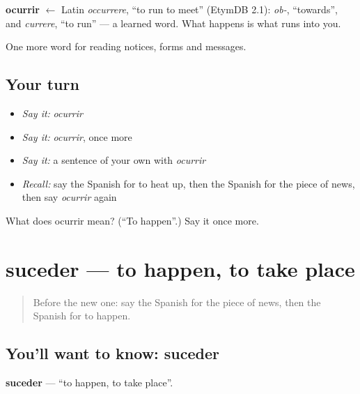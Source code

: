 \begin{cousinweb}
\textbf{ocurrir} $\leftarrow$ Latin \emph{occurrere}, \textquotedblleft{}to run to meet\textquotedblright{} (EtymDB 2.1): \emph{ob-}, \textquotedblleft{}towards\textquotedblright{}, and \emph{currere}, \textquotedblleft{}to run\textquotedblright{} — a learned word. What happens is what runs into you.
\end{cousinweb}

\begin{grammarlens}[title={What you've built}]
One more word for reading notices, forms and messages.
\end{grammarlens}

\subsection*{Your turn}
\begin{itemize}
\raggedright
  \item \emph{Say it:} \emph{ocurrir}
  \item \emph{Say it:} \emph{ocurrir}, once more
  \item \emph{Say it:} a sentence of your own with \emph{ocurrir}
  \item \emph{Recall:} say the Spanish for to heat up, then the Spanish for the piece of news, then say \emph{ocurrir} again
\end{itemize}

\begin{tcolorbox}[breakable,colback=teal!4,colframe=teal!35!black,title={Before you move on}]
What does ocurrir mean? (\textquotedblleft{}To happen\textquotedblright{}.) Say it once more.
\end{tcolorbox}
\section[suceder]{suceder — to happen, to take place}

\label{lesson:ES-C495-suceder}



\begin{quote}
Before the new one: say the Spanish for the piece of news, then the Spanish for to happen.
\end{quote}

\subsection*{You'll want to know: suceder}
\textbf{suceder} — \textquotedblleft{}to happen, to take place\textquotedblright{}.

